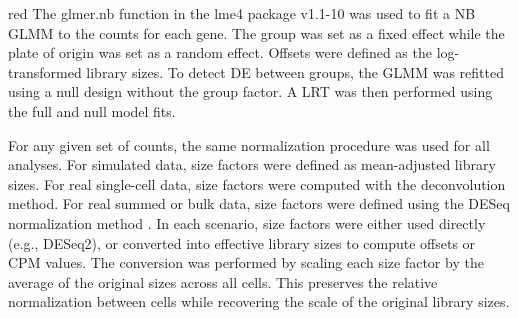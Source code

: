 \documentclass{article}
\begin{document}
\begin{color}{red}
The glmer.nb function in the lme4 package v1.1-10 was used to fit a NB GLMM to the counts for each gene.
The group was set as a fixed effect while the plate of origin was set as a random effect.
Offsets were defined as the log-transformed library sizes.
To detect DE between groups, the GLMM was refitted using a null design without the group factor.
A LRT was then performed using the full and null model fits.

For any given set of counts, the same normalization procedure was used for all analyses.
For simulated data, size factors were defined as mean-adjusted library sizes.
For real single-cell data, size factors were computed with the deconvolution method.
For real summed or bulk data, size factors were defined using the DESeq normalization method \citep{anders2010differential}.
In each scenario, size factors were either used directly (e.g., DESeq2), or converted into effective library sizes to compute offsets or CPM values.
The conversion was performed by scaling each size factor by the average of the original sizes across all cells.
This preserves the relative normalization between cells while recovering the scale of the original library sizes.
\end{color}
\end{document}
